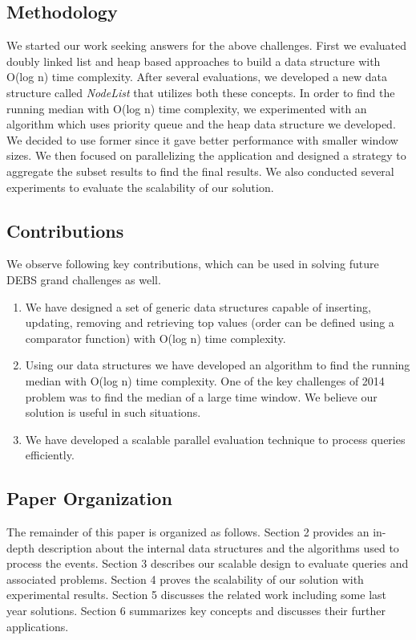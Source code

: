 \subsection{Methodology}

We started our work seeking answers for the above challenges. First we evaluated doubly linked list and heap based approaches to build a data structure with O(log n) time complexity. After several evaluations, we developed a new data structure called \textit{NodeList} that utilizes both these concepts. In order to find the running median with O(log n) time complexity, we experimented with an algorithm which uses priority queue and the heap data structure we developed. We decided to use former since it gave better performance with smaller window sizes. We then focused on parallelizing the application and designed a strategy to aggregate the subset results to find the final results. We also conducted several experiments to evaluate the scalability of our solution. 


\subsection{Contributions}
We observe following key contributions, which can be used in solving future DEBS grand challenges as well.
\begin{enumerate}
	\item We have designed a set of  generic data structures capable of inserting, updating, removing and retrieving top values (order can be defined using a comparator function) with O(log n) time complexity. 
	\item Using our data structures we have developed an algorithm to find the running median with O(log n) time complexity. One of the key challenges of 2014 problem \cite{jerzak2014debs}  was to find the median of a large time window. We believe our solution is useful in such situations.
	\item We have developed a scalable parallel evaluation technique to process queries efficiently. 
\end{enumerate}

\subsection{Paper Organization}
The remainder of this paper is organized as follows. Section 2 provides an in-depth description about the internal data structures and the algorithms used to process the events. Section 3 describes our scalable design to evaluate queries and associated problems. Section 4 proves the scalability of our solution with experimental results. Section 5 discusses the related work including some last year solutions. Section 6 summarizes key concepts and discusses their further applications. 

